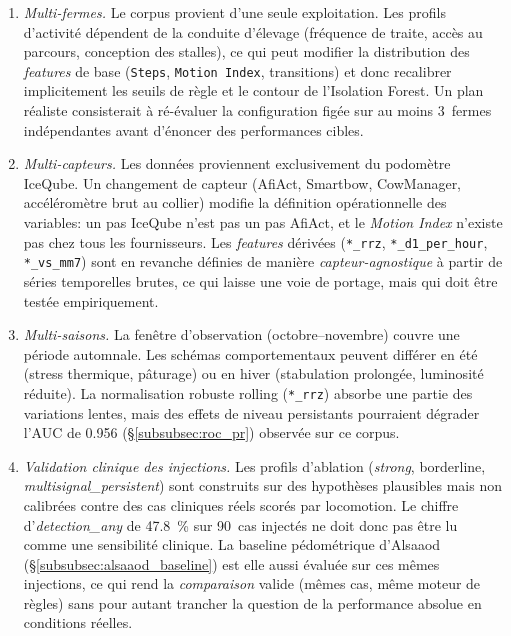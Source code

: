 \begin{enumerate}
    \item \textit{Multi-fermes.} Le corpus provient d'une seule
    exploitation. Les profils d'activité dépendent de la conduite
    d'élevage (fréquence de traite, accès au parcours, conception des
    stalles), ce qui peut modifier la distribution des \textit{features}
    de base (\texttt{Steps}, \texttt{Motion\,Index}, transitions) et
    donc recalibrer implicitement les seuils de règle et le contour de
    l'Isolation Forest. Un plan réaliste consisterait à ré-évaluer la
    configuration figée sur au moins 3~fermes indépendantes avant
    d'énoncer des performances cibles.

    \item \textit{Multi-capteurs.} Les données proviennent exclusivement
    du podomètre IceQube. Un changement de capteur (AfiAct, Smartbow,
    CowManager, accéléromètre brut au collier) modifie la définition
    opérationnelle des variables: un \og pas \fg{} IceQube n'est pas un
    \og pas \fg{} AfiAct, et le \textit{Motion Index} n'existe pas chez tous les
    fournisseurs. Les \textit{features} dérivées (\texttt{*\_rrz},
    \texttt{*\_d1\_per\_hour}, \texttt{*\_vs\_mm7}) sont en revanche
    définies de manière \textit{capteur-agnostique} à partir de séries
    temporelles brutes, ce qui laisse une voie de portage, mais qui
    doit être testée empiriquement.

    \item \textit{Multi-saisons.} La fenêtre d'observation
    (octobre--novembre) couvre une période automnale. Les schémas
    comportementaux peuvent différer en été (stress thermique, pâturage)
    ou en hiver (stabulation prolongée, luminosité réduite). La
    normalisation robuste rolling (\texttt{*\_rrz}) absorbe une partie
    des variations lentes, mais des effets de niveau persistants
    pourraient dégrader l'AUC de 0.956 (\S\ref{subsubsec:roc_pr})
    observée sur ce corpus.

    \item \textit{Validation clinique des injections.} Les profils
    d'ablation (\textit{strong}, borderline,
    \textit{multisignal\_persistent}) sont construits sur des
    hypothèses plausibles mais non calibrées contre des cas cliniques
    réels scorés par locomotion. Le chiffre d'\textit{detection\_any}
    de 47.8~\% sur 90~cas injectés ne doit donc pas être lu comme une
    sensibilité clinique. La baseline pédométrique d'Alsaaod
    (\S\ref{subsubsec:alsaaod_baseline}) est elle aussi évaluée sur ces
    mêmes injections, ce qui rend la \textit{comparaison} valide
    (mêmes cas, même moteur de règles) sans pour autant trancher la
    question de la performance absolue en conditions réelles.


\end{enumerate}
